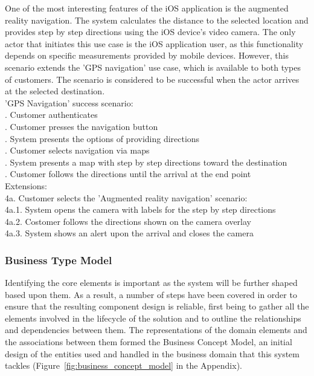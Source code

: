 One of the most interesting features of the iOS application is the augmented reality navigation. The system calculates the distance to the selected location and provides step by step directions using the iOS device's video camera. The only actor that initiates this use case is the iOS application user, as this functionality depends on specific measurements provided by mobile devices. However, this scenario extends the 'GPS navigation' use case, which is available to both types of customers. The scenario is considered to be successful when the actor arrives at the selected destination.\\

\indent 'GPS Navigation' success scenario:\\
. Customer authenticates\\
. Customer presses the navigation button\\
. System presents the options of providing directions\\
. Customer selects navigation via maps\\
. System presents a map with step by step directions toward the destination\\
. Customer follows the directions until the arrival at the end point\\
Extensions:\\
\indent 4a. Customer selects the 'Augmented reality navigation' scenario:\\
\indent\indent 4a.1. System opens the camera with labels for the step by step directions\\
\indent\indent  4a.2. Costomer follows the directions shown on the camera overlay\\
\indent\indent  4a.3. System shows an alert upon the arrival and closes the camera

\subsubsection{Business Type Model}

Identifying the core elements is important as the system will be further shaped based upon them. As a result, a number of steps have been covered in order to ensure that the resulting component design is reliable, first being to gather all the elements involved in the lifecycle of the solution and to outline the relationships and dependencies between them. The representations of the domain elements and the associations between them formed the Business Concept Model, an initial design of the entities used and handled in the business domain that this system tackles (Figure~\ref{fig:business_concept_model} in the Appendix).\\

